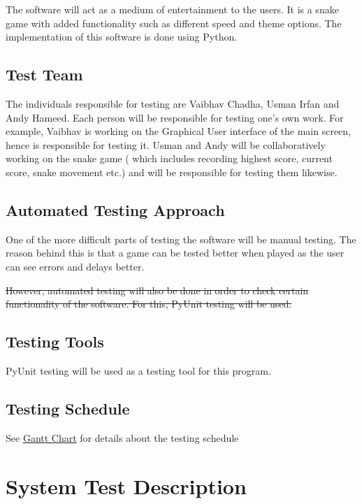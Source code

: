 \documentclass[12pt, titlepage]{article}
\begin{document}
The software will act as a medium of entertainment to the users. It is a snake game with added functionality such as different speed and theme options. The implementation of this software is done using Python. 

\subsection{Test Team}

The individuals responsible for testing are Vaibhav Chadha, Usman Irfan and Andy Hameed. Each person will be responsible for testing one's own work. For example, Vaibhav is working on the Graphical User interface of the main screen, hence is responsible for testing it. Usman and Andy will be collaboratively working on the snake game ( which includes recording highest score, current score, snake movement etc.) and will be responsible for testing them likewise.

\subsection{Automated Testing Approach}

One of the more difficult parts of testing the software will be manual testing. The reason behind this is that a game can be tested better when played as the user can see errors and delays better.

\st{However, automated testing will also be done in order to check certain functionality of the software. For this, PyUnit testing will be used.}

\subsection{Testing Tools}

PyUnit testing will be used as a testing tool for this program. 

\subsection{Testing Schedule}

See \href{https://gitlab.cas.mcmaster.ca/hameea1/se3xa3/tree/master/BlankProjectTemplate/ProjectSchedule}{Gantt Chart} for details about the testing schedule
	
\section{System Test Description}
	
\end{document}
